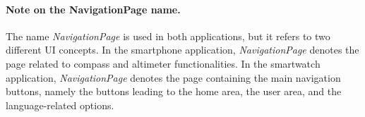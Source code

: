 \paragraph{Note on the NavigationPage name.}
The name \textit{NavigationPage} is used in both applications, but it refers to two different UI concepts. In the smartphone application, \textit{NavigationPage} denotes the page related to compass and altimeter functionalities. In the smartwatch application, \textit{NavigationPage} denotes the page containing the main navigation buttons, namely the buttons leading to the home area, the user area, and the language-related options.











